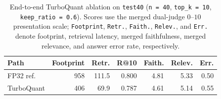 \begin{table}[htbp]
\centering
\caption{End-to-end TurboQuant ablation on \texttt{test40} (\texttt{n = 40}, \texttt{top\_k = 10}, \texttt{keep\_ratio = 0.6}). Scores use the merged dual-judge $0$--$10$ presentation scale; \texttt{Footprint}, \texttt{Retr.}, \texttt{Faith.}, \texttt{Relev.}, and \texttt{Err.} denote footprint, retrieval latency, merged faithfulness, merged relevance, and answer error rate, respectively.}
\label{tab:turboquant-e2e-ablation}
{\small
\setlength{\tabcolsep}{3.8pt}
\begin{tabular}{@{}l r r r r r r@{}}
\toprule
Path & Footprint & Retr. & R@10 & Faith. & Relev. & Err. \\
\midrule
FP32 ref. & 958 & 111.5 & 0.800 & 4.81 & 5.33 & 0.50 \\
TurboQuant & 406 & 69.9 & 0.787 & 4.61 & 5.14 & 0.55 \\
\bottomrule
\end{tabular}
}
\end{table}
